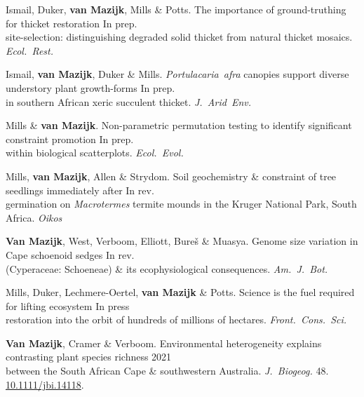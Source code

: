 Ismail, Duker, \textbf{van Mazijk}, Mills \& Potts.
The importance of ground-truthing for thicket restoration    \hfill In prep. \\
\hspace{2em} site-selection: distinguishing degraded solid thicket from natural thicket mosaics. \textit{Ecol.~Rest.}

Ismail, \textbf{van Mazijk}, Duker \& Mills.
\textit{Portulacaria~afra} canopies support diverse understory plant growth-forms
                                                              \hfill In prep. \\
\hspace{2em} in southern African xeric succulent thicket. \textit{J.~Arid~Env.}

Mills \& \textbf{van Mazijk}.
Non-parametric permutation testing to identify significant constraint promotion                                                     \hfill In prep. \\
\hspace{2em} within biological scatterplots.
  \textit{Ecol.~Evol.}

Mills, \textbf{van Mazijk}, Allen \& Strydom.
Soil geochemistry \& constraint of tree seedlings immediately after
                                                              \hfill In rev. \\
\hspace{2em} germination on \textit{Macrotermes} termite
  mounds in the Kruger National Park, South Africa.
  \textit{Oikos}

\textbf{Van Mazijk}, West, Verboom, Elliott, Bureš \& Muasya.
Genome size variation in Cape schoenoid sedges                \hfill In rev. \\
\hspace{2em} (Cyperaceae: Schoeneae) \& its ecophysiological consequences.
  \textit{Am.~J.~Bot.}

Mills, Duker, Lechmere-Oertel, \textbf{van Mazijk} \& Potts.
Science is the fuel required for lifting ecosystem             \hfill In press \\
\hspace{2em} restoration into the orbit of hundreds of millions of hectares.
  \textit{Front.~Cons.~Sci.}

\textbf{Van Mazijk}, Cramer \& Verboom.
Environmental heterogeneity explains contrasting plant species richness
                                                                  \hfill 2021 \\
\hspace{2em}
  between the South African Cape \& southwestern Australia.
  \textit{J.~Biogeog.}
  48. \href{https://doi.org/10.1111/jbi.14118}{10.1111/jbi.14118}.

